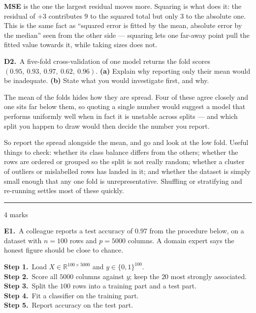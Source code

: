 \documentclass[10pt,a4paper]{article}
\newcommand{\parthead}[2]{\vspace{2pt}\noindent\rule{\linewidth}{0.4pt}\par\vspace{2pt}%
  \noindent{\bfseries Part #1}\hfill{\small #2}\par\vspace{1pt}}
\newcommand{\sol}[1]{\textbf{#1}}
\begin{document}
\sol{MSE} is the one the largest residual moves more. Squaring is what does it: the residual of $+3$ contributes $9$ to the squared total but only $3$ to the absolute one. This is the same fact as ``squared error is fitted by the mean, absolute error by the median'' seen from the other side --- squaring lets one far-away point pull the fitted value towards it, while taking sizes does not.

\vspace{6pt}

\textbf{D2.}\ A five-fold cross-validation of one model returns the fold scores $(0.95,\ 0.93,\ 0.97,\ 0.62,\ 0.96)$. \textbf{(a)} Explain why reporting only their mean would be inadequate. \textbf{(b)} State what you would investigate first, and why.

\vspace{2pt}

The mean of the folds hides how they are spread. Four of these agree closely and one sits far below them, so quoting a single number would suggest a model that performs uniformly well when in fact it is unstable across splits --- and which split you happen to draw would then decide the number you report.\par\vspace{1mm}So report the spread alongside the mean, and go and look at the low fold. Useful things to check: whether its class balance differs from the others; whether the rows are ordered or grouped so the split is not really random; whether a cluster of outliers or mislabelled rows has landed in it; and whether the dataset is simply small enough that any one fold is unrepresentative. Shuffling or stratifying and re-running settles most of these quickly.

\newpage

\parthead{E --- Reasoning}{4 marks}

\textbf{E1.}\ A colleague reports a test accuracy of $0.97$ from the procedure below, on a dataset with
$n = 100$ rows and $p = 5000$ columns. A domain expert says the honest figure should be close to chance.

\vspace{2mm}
\hspace*{6mm}\textbf{Step 1.}\ Load $X \in \mathbb{R}^{100 \times 5000}$ and $y \in \{0,1\}^{100}$.\\
\hspace*{6mm}\textbf{Step 2.}\ Score all $5000$ columns against $y$; keep the $20$ most strongly associated.\\
\hspace*{6mm}\textbf{Step 3.}\ Split the $100$ rows into a training part and a test part.\\
\hspace*{6mm}\textbf{Step 4.}\ Fit a classifier on the training part.\\
\hspace*{6mm}\textbf{Step 5.}\ Report accuracy on the test part.
\end{document}
